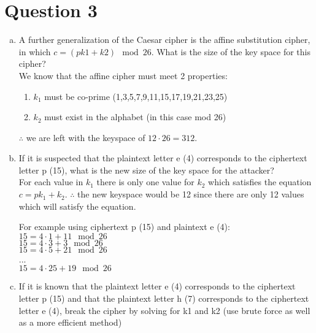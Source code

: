 \documentclass[fleqn, 12pt]{article}
\begin{document}
\newpage
\section*{Question 3}

\begin{enumerate}[a)]
    \item 
        A further generalization of the Caesar cipher is the affine substitution cipher, in which $c = (pk1 + k2) \mod 26$. What is the size of the key space for this cipher?\\

        We know that the affine cipher must meet 2 properties:
        \begin{enumerate}[1)]
            \item $k_1$ must be co-prime (1,3,5,7,9,11,15,17,19,21,23,25)
            \item $k_2$ must exist in the alphabet (in this case mod 26)
        \end{enumerate}
        
        $\therefore$ we are left with the keyspace of $12 \cdot 26=312$.
    
    \item
        If it is suspected that the plaintext letter e (4) corresponds to the ciphertext letter p (15), what is the new size of the key space for the attacker?\\
    
        For each value in $k_1$ there is only one value for $k_2$ which satisfies the equation $c=pk_1+k_2$. $\therefore$ the new keyspace would be 12 since there are only 12 values which will satisfy the equation. 
        
        For example using ciphertext p (15) and plaintext e (4):\\
        $15=4 \cdot 1 + 11 \mod 26$\\
        $15=4 \cdot 3 + 3 \mod 26$\\
        $15=4 \cdot 5 + 21 \mod 26$\\
        ...\\
        $15=4 \cdot 25 + 19 \mod 26$\\
        
    \item
        If it is known that the plaintext letter e (4) corresponds to the ciphertext letter p (15) and that the plaintext letter h (7) corresponds to the ciphertext letter e (4), break the cipher by solving for k1 and k2 (use brute force as well as a more efficient method)\\
    

\end{enumerate}
\end{document}
